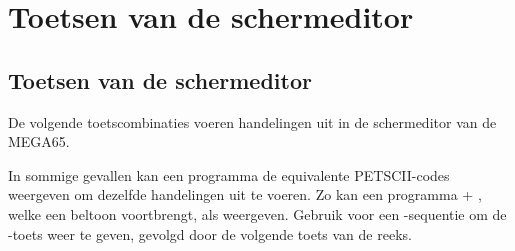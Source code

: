 \chapter{Toetsen van de schermeditor}

\section{Toetsen van de schermeditor}

De volgende toetscombinaties voeren handelingen uit in de schermeditor van de MEGA65.

In sommige gevallen kan een programma de equivalente PETSCII-codes weergeven om dezelfde handelingen uit te voeren. Zo kan een programma  + , welke een beltoon voortbrengt, als  weergeven. Gebruik voor een -sequentie  om de -toets weer te geven, gevolgd door de volgende toets van de reeks.

